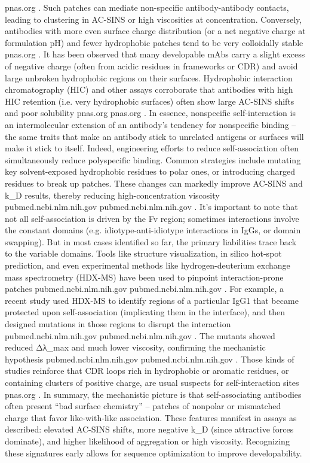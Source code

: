 pnas.org
. Such patches can mediate non-specific antibody-antibody contacts, leading to clustering in AC-SINS or high viscosities at concentration. Conversely, antibodies with more even surface charge distribution (or a net negative charge at formulation pH) and fewer hydrophobic patches tend to be very colloidally stable
pnas.org
. It has been observed that many developable mAbs carry a slight excess of negative charge (often from acidic residues in frameworks or CDR) and avoid large unbroken hydrophobic regions on their surfaces. Hydrophobic interaction chromatography (HIC) and other assays corroborate that antibodies with high HIC retention (i.e. very hydrophobic surfaces) often show large AC-SINS shifts and poor solubility
pnas.org
pnas.org
. In essence, nonspecific self-interaction is an intermolecular extension of an antibody’s tendency for nonspecific binding – the same traits that make an antibody stick to unrelated antigens or surfaces will make it stick to itself. Indeed, engineering efforts to reduce self-association often simultaneously reduce polyspecific binding. Common strategies include mutating key solvent-exposed hydrophobic residues to polar ones, or introducing charged residues to break up patches. These changes can markedly improve AC-SINS and k_D results, thereby reducing high-concentration viscosity
pubmed.ncbi.nlm.nih.gov
pubmed.ncbi.nlm.nih.gov
. It’s important to note that not all self-association is driven by the Fv region; sometimes interactions involve the constant domains (e.g. idiotype-anti-idiotype interactions in IgGs, or domain swapping). But in most cases identified so far, the primary liabilities trace back to the variable domains. Tools like structure visualization, in silico hot-spot prediction, and even experimental methods like hydrogen-deuterium exchange mass spectrometry (HDX-MS) have been used to pinpoint interaction-prone patches
pubmed.ncbi.nlm.nih.gov
pubmed.ncbi.nlm.nih.gov
. For example, a recent study used HDX-MS to identify regions of a particular IgG1 that became protected upon self-association (implicating them in the interface), and then designed mutations in those regions to disrupt the interaction
pubmed.ncbi.nlm.nih.gov
pubmed.ncbi.nlm.nih.gov
. The mutants showed reduced Δλ_max and much lower viscosity, confirming the mechanistic hypothesis
pubmed.ncbi.nlm.nih.gov
pubmed.ncbi.nlm.nih.gov
. Those kinds of studies reinforce that CDR loops rich in hydrophobic or aromatic residues, or containing clusters of positive charge, are usual suspects for self-interaction sites
pnas.org
. In summary, the mechanistic picture is that self-associating antibodies often present “bad surface chemistry” – patches of nonpolar or mismatched charge that favor like-with-like association. These features manifest in assays as described: elevated AC-SINS shifts, more negative k_D (since attractive forces dominate), and higher likelihood of aggregation or high viscosity. Recognizing these signatures early allows for sequence optimization to improve developability.
